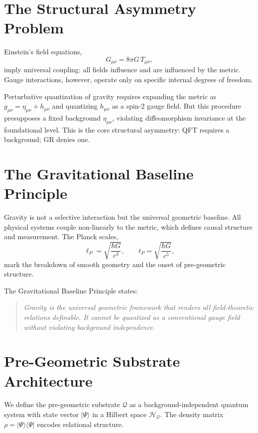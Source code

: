 \documentclass[11pt]{article}
\begin{document}
\section{The Structural Asymmetry Problem}

Einstein's field equations,
\begin{equation}
G_{\mu\nu} = 8\pi G\, T_{\mu\nu},
\label{eq:einstein}
\end{equation}
imply universal coupling: all fields influence and are influenced by the metric. Gauge interactions, however, operate only on specific internal degrees of freedom.

Perturbative quantization of gravity requires expanding the metric as $g_{\mu\nu} = \eta_{\mu\nu} + h_{\mu\nu}$ and quantizing $h_{\mu\nu}$ as a spin-2 gauge field. But this procedure presupposes a fixed background $\eta_{\mu\nu}$, violating diffeomorphism invariance at the foundational level. This is the core structural asymmetry: QFT requires a background; GR denies one.

\section{The Gravitational Baseline Principle}

Gravity is not a selective interaction but the universal geometric baseline. All physical systems couple non-linearly to the metric, which defines causal structure and measurement. The Planck scales,
\begin{equation}
\ell_P = \sqrt{\frac{\hbar G}{c^3}}, \qquad t_P = \sqrt{\frac{\hbar G}{c^5}},
\label{eq:planck}
\end{equation}
mark the breakdown of smooth geometry and the onset of pre-geometric structure.

The Gravitational Baseline Principle states:

\begin{quote}
\emph{Gravity is the universal geometric framework that renders all field-theoretic relations definable. It cannot be quantized as a conventional gauge field without violating background independence.}
\end{quote}

\section{Pre-Geometric Substrate Architecture}

We define the pre-geometric substrate $\mathcal{Q}$ as a background-independent quantum system with state vector $|\Psi\rangle$ in a Hilbert space $\mathcal{H}_\mathcal{Q}$. The density matrix $\rho = |\Psi\rangle\langle\Psi|$ encodes relational structure.
\end{document}
